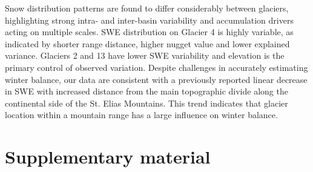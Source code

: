 \documentclass[twocolumn, letterpaper]{igs}
\begin{document}
Snow distribution patterns are found to differ considerably between glaciers, highlighting strong intra- and inter-basin variability and accumulation drivers acting on multiple scales. SWE distribution on Glacier 4 is highly variable, as indicated by shorter range distance, higher nugget value and lower explained variance. Glaciers 2 and 13 have lower SWE variability and elevation is the primary control of observed variation. Despite challenges in accurately estimating winter balance, our data are consistent with a previously reported linear decrease in SWE with increased distance from the main topographic divide along the continental side of the St. Elias Mountains. This trend indicates that glacier location within a mountain range has a large influence on winter balance. 

%

%


\pagebreak 
\section{Supplementary material}
\end{document}
